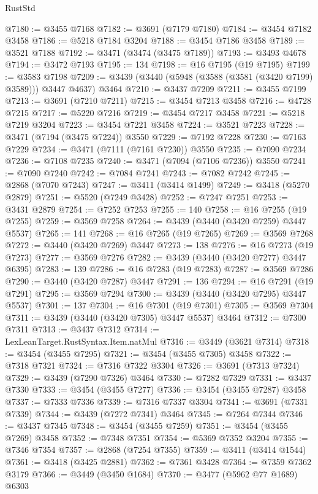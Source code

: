 \begin{lexlean}{RustStd}
\begin{coremodule}
{{{{{{{{{{{{{{{{{{{@7180 := @3455 @7168
@7182 := @3691 (@7179 @7180)
@7184 := @3454 @7182 @3458
@7186 := @5218 @7184 @3204
@7188 := @3454 @7186 @3458
@7189 := @3521 @7188
@7192 := @3471 (@3474 (@3475 @7189))
@7193 := @3493 @4678
@7194 := @3472 @7193
@7195 := 134
@7198 := @16 @7195 (@19 @7195)
@7199 := @3583 @7198
@7209 := @3439 (@3440 (@5948 (@3588 (@3581 (@3420 @7199) @3589))) @3447 @4637) @3464
@7210 := @3437 @7209
@7211 := @3455 @7199
@7213 := @3691 (@7210 @7211)
@7215 := @3454 @7213 @3458
@7216 := @4728 @7215
@7217 := @5220 @7216
@7219 := @3454 @7217 @3458
@7221 := @5218 @7219 @3204
@7223 := @3454 @7221 @3458
@7224 := @3521 @7223
@7228 := @3471 (@7194 (@3475 @7224)) @3550
@7229 := @7192 @7228
@7230 := @7163 @7229
@7234 := @3471 (@7111 (@7161 @7230)) @3550
@7235 := @7090 @7234
@7236 := @7108 @7235
@7240 := @3471 (@7094 (@7106 @7236)) @3550
@7241 := @7090 @7240
@7242 := @7084 @7241
@7243 := @7082 @7242
@7245 := @2868 (@7070 @7243)
@7247 := @3411 (@3414 @1499)
@7249 := @3418 (@5270 @2879)
@7251 := @5520 (@7249 @3428)
@7252 := @7247 @7251
@7253 := @3431 @2879
@7254 := @7252 @7253
@7255 := 140
@7258 := @16 @7255 (@19 @7255)
@7259 := @3569 @7258
@7264 := @3439 (@3440 (@3420 @7259) @3447 @5537)
@7265 := 141
@7268 := @16 @7265 (@19 @7265)
@7269 := @3569 @7268
@7272 := @3440 (@3420 @7269) @3447
@7273 := 138
@7276 := @16 @7273 (@19 @7273)
@7277 := @3569 @7276
@7282 := @3439 (@3440 (@3420 @7277) @3447 @6395)
@7283 := 139
@7286 := @16 @7283 (@19 @7283)
@7287 := @3569 @7286
@7290 := @3440 (@3420 @7287) @3447
@7291 := 136
@7294 := @16 @7291 (@19 @7291)
@7295 := @3569 @7294
@7300 := @3439 (@3440 (@3420 @7295) @3447 @5537)
@7301 := 137
@7304 := @16 @7301 (@19 @7301)
@7305 := @3569 @7304
@7311 := @3439 (@3440 (@3420 @7305) @3447 @5537) @3464
@7312 := @7300 @7311
@7313 := @3437 @7312
@7314 := LexLeanTarget.RustSyntax.Item.natMul
@7316 := @3449 (@3621 @7314)
@7318 := @3454 (@3455 @7295)
@7321 := @3454 (@3455 @7305) @3458
@7322 := @7318 @7321
@7324 := @7316 @7322 @3304
@7326 := @3691 (@7313 @7324)
@7329 := @3439 (@7290 @7326) @3464
@7330 := @7282 @7329
@7331 := @3437 @7330
@7333 := @3454 (@3455 @7277)
@7336 := @3454 (@3455 @7287) @3458
@7337 := @7333 @7336
@7339 := @7316 @7337 @3304
@7341 := @3691 (@7331 @7339)
@7344 := @3439 (@7272 @7341) @3464
@7345 := @7264 @7344
@7346 := @3437 @7345
@7348 := @3454 (@3455 @7259)
@7351 := @3454 (@3455 @7269) @3458
@7352 := @7348 @7351
@7354 := @5369 @7352 @3204
@7355 := @7346 @7354
@7357 := @2868 (@7254 @7355)
@7359 := @3411 (@3414 @1544)
@7361 := @3418 (@3425 @2881)
@7362 := @7361 @3428
@7364 := @7359 @7362 @3179
@7366 := @3449 (@3450 @1684)
@7370 := @3477 (@5962 @77 @1689) @6303
}}}}}}}}}}}}}}}}}}}
\end{coremodule}
\end{lexlean}
